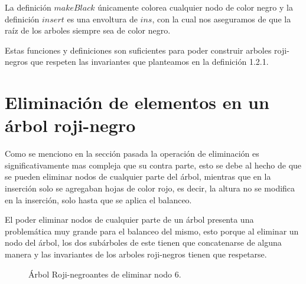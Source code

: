 \documentclass[8pt,leqno,pdflatex,spanish]{book}
\newcommand{\Arn}{Árbol Roji-negro}
\newcommand{\arn}{árbol roji-negro}
\newcommand{\arns}{arboles roji-negros}
\theoremstyle{plain}
\theoremstyle{definition}
\theoremstyle{remark}
\begin{document}
La definici\'on $makeBlack$ únicamente colorea cualquier nodo de color negro y la definición $
insert$ es una envoltura de $ins$, con la cual nos aseguramos de que la ra\'iz de los arboles 
siempre sea de color negro.

Estas funciones y definiciones son suficientes para poder construir {\arns} que respeten las 
invariantes que planteamos en la definici\'on 1.2.1. 

\section{Eliminación de elementos en un {\arn}}

Como se menciono en la secci\'on pasada la operaci\'on de eliminaci\'on es significativamente mas 
compleja que su contra parte, esto se debe al hecho de que se pueden eliminar nodos de cualquier 
parte del \'arbol, mientras que en la inserci\'on solo se agregaban hojas de color rojo, es decir, 
la altura no se modifica en la inserción\cite{RBTypes}, solo hasta que se aplica el balanceo.

El poder eliminar nodos de cualquier parte de un \'arbol presenta una problemática muy grande para 
el balanceo del mismo, esto porque al eliminar un nodo del \'arbol, los dos subárboles de este 
tienen que concatenarse de alguna manera y las invariantes de los {\arns} tienen que respetarse.

\begin{figure}
\centering 
\captionsetup{justification=centering}
\label{arbolRB}
\caption{{\Arn antes de eliminar nodo 6.}}
\end{figure}
\end{document}
